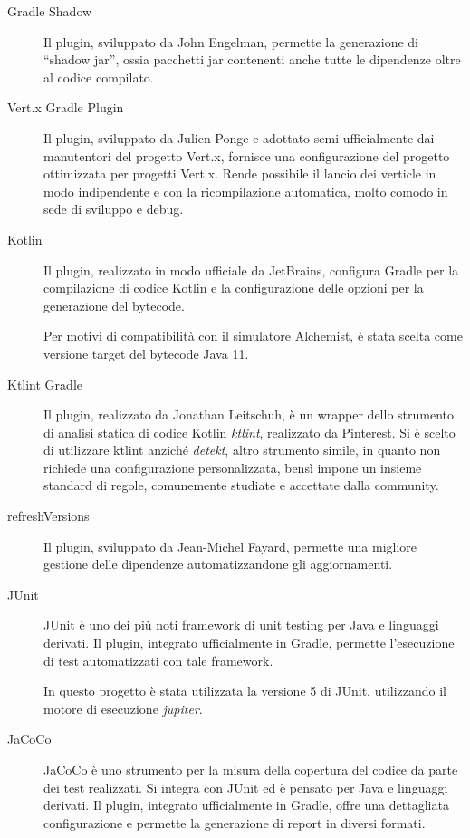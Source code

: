       \begin{description}
        \item[Gradle Shadow]
          Il plugin, sviluppato da John Engelman, permette la generazione di ``shadow jar'', ossia pacchetti jar contenenti anche tutte le dipendenze oltre al codice compilato.

        \item[Vert.x Gradle Plugin]
          Il plugin, sviluppato da Julien Ponge e adottato semi-ufficialmente dai manutentori del progetto Vert.x, fornisce una configurazione del progetto ottimizzata per progetti Vert.x.
          Rende possibile il lancio dei verticle in modo indipendente e con la ricompilazione automatica, molto comodo in sede di sviluppo e debug.

        \item[Kotlin]
          Il plugin, realizzato in modo ufficiale da JetBrains, configura Gradle per la compilazione di codice Kotlin e la configurazione delle opzioni per la generazione del bytecode.

          Per motivi di compatibilità con il simulatore Alchemist, è stata scelta come versione target del bytecode Java 11.

        \item[Ktlint Gradle]
          Il plugin, realizzato da Jonathan Leitschuh, è un wrapper dello strumento di analisi statica di codice Kotlin \emph{ktlint}, realizzato da Pinterest.
          Si è scelto di utilizzare ktlint anziché \emph{detekt}, altro strumento simile, in quanto non richiede una configurazione personalizzata, bensì impone un insieme standard di regole, comunemente studiate e accettate dalla community.

        \item[refreshVersions]
          Il plugin, sviluppato da Jean-Michel Fayard, permette una migliore gestione delle dipendenze automatizzandone gli aggiornamenti.

        \item[JUnit]
          JUnit è uno dei più noti framework di unit testing per Java e linguaggi derivati.
          Il plugin, integrato ufficialmente in Gradle, permette l'esecuzione di test automatizzati con tale framework.

          In questo progetto è stata utilizzata la versione 5 di JUnit, utilizzando il motore di esecuzione \emph{jupiter}.
        \item[JaCoCo]
          JaCoCo è uno strumento per la misura della copertura del codice da parte dei test realizzati.
          Si integra con JUnit ed è pensato per Java e linguaggi derivati.
          Il plugin, integrato ufficialmente in Gradle, offre una dettagliata configurazione e permette la generazione di report in diversi formati.
      \end{description}

